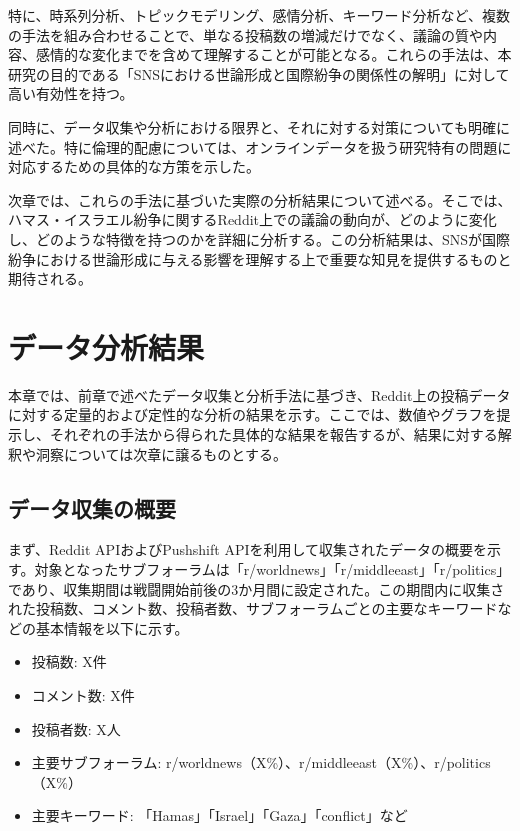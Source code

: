 \documentclass[11pt, a4j]{jreport}
\begin{document}
    特に、時系列分析、トピックモデリング、感情分析、キーワード分析など、複数の手法を組み合わせることで、単なる投稿数の増減だけでなく、議論の質や内容、感情的な変化までを含めて理解することが可能となる。これらの手法は、本研究の目的である「SNSにおける世論形成と国際紛争の関係性の解明」に対して高い有効性を持つ。

    同時に、データ収集や分析における限界と、それに対する対策についても明確に述べた。特に倫理的配慮については、オンラインデータを扱う研究特有の問題に対応するための具体的な方策を示した。

    次章では、これらの手法に基づいた実際の分析結果について述べる。そこでは、ハマス・イスラエル紛争に関するReddit上での議論の動向が、どのように変化し、どのような特徴を持つのかを詳細に分析する。この分析結果は、SNSが国際紛争における世論形成に与える影響を理解する上で重要な知見を提供するものと期待される。

    \chapter{データ分析結果}
    本章では、前章で述べたデータ収集と分析手法に基づき、Reddit上の投稿データに対する定量的および定性的な分析の結果を示す。ここでは、数値やグラフを提示し、それぞれの手法から得られた具体的な結果を報告するが、結果に対する解釈や洞察については次章に譲るものとする。

    \section{データ収集の概要}
    まず、Reddit APIおよびPushshift APIを利用して収集されたデータの概要を示す。対象となったサブフォーラムは「r/worldnews」「r/middleeast」「r/politics」であり、収集期間は戦闘開始前後の3か月間に設定された。この期間内に収集された投稿数、コメント数、投稿者数、サブフォーラムごとの主要なキーワードなどの基本情報を以下に示す。

    \begin{itemize}
        \item 投稿数: X件

        \item コメント数: X件

        \item 投稿者数: X人

        \item 主要サブフォーラム: r/worldnews（X\%）、r/middleeast（X\%）、r/politics（X\%）

        \item 主要キーワード: 「Hamas」「Israel」「Gaza」「conflict」など
    \end{itemize}
\end{document}
